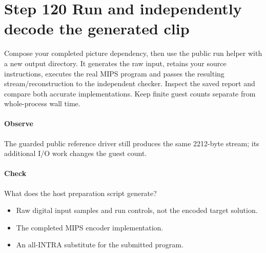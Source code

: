 \section{Step 120 Run and independently decode the generated clip}\label{h263-clip-s10}
Compose your completed picture dependency, then use the public run helper with
a new output directory. It generates the raw input, retains your source instructions,
executes the real MIPS program and passes the resulting stream/reconstruction to
the independent checker. Inspect the saved report and compare both accurate
implementations. Keep finite guest counts separate from whole-process wall time.

\paragraph{Observe} The guarded public reference driver still produces the same 2212-byte stream; its additional I/O work changes the guest count.
\paragraph{Check} What does the host preparation script generate?
\begin{itemize}
  \item[A.] Raw digital input samples and run controls, not the encoded target solution.
  \item[B.] The completed MIPS encoder implementation.
  \item[C.] An all-INTRA substitute for the submitted program.
\end{itemize}

